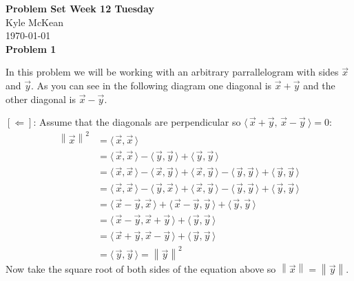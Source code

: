 \documentclass[fleqn]{article}
\newcommand{\problem}[1]{\large\textbf{Problem #1}\normalsize}
\newcommand{\normF}[1]{\left\lVert#1\right\rVert}
\begin{document}
\noindent\Large\textbf{Problem Set Week 12 Tuesday} \\
\normalsize
Kyle McKean \\
\today \\

\problem{1}

In this problem we will be working with an arbitrary parrallelogram with sides
$\vec{x}$ and $\vec{y}$. As you can see in the following diagram one diagonal is
$\vec{x} + \vec{y}$ and the other diagonal is $\vec{x} - \vec{y}$. \\

$[\Leftarrow]$: Assume that the diagonals are perpendicular so
$\langle \, \vec{x} + \vec{y}, \, \vec{x} - \vec{y} \: \rangle = 0$:
\begin{align*}
  \normF{\vec{x}}^2
  &= \langle \, \vec{x}, \vec{x} \, \rangle \\
  &= \langle \, \vec{x}, \vec{x} \, \rangle
   - \langle \, \vec{y}, \vec{y} \, \rangle
   + \langle \, \vec{y}, \vec{y} \, \rangle \\
  &= \langle \, \vec{x}, \vec{x} \, \rangle
   - \langle \, \vec{x}, \vec{y} \, \rangle
   + \langle \, \vec{x}, \vec{y} \, \rangle
   - \langle \, \vec{y}, \vec{y} \, \rangle
   + \langle \, \vec{y}, \vec{y} \, \rangle \\
  &= \langle \, \vec{x}, \vec{x} \, \rangle
   - \langle \, \vec{y}, \vec{x} \, \rangle
   + \langle \, \vec{x}, \vec{y} \, \rangle
   - \langle \, \vec{y}, \vec{y} \, \rangle
   + \langle \, \vec{y}, \vec{y} \, \rangle \\
  &= \langle \, \vec{x} - \vec{y}, \vec{x} \, \rangle
   + \langle \, \vec{x} - \vec{y}, \vec{y} \, \rangle
   + \langle \, \vec{y}, \vec{y} \, \rangle \\
  &= \langle \, \vec{x} - \vec{y}, \vec{x} + \vec{y} \, \rangle
   + \langle \, \vec{y}, \vec{y} \, \rangle \\
  &= \langle \, \vec{x} + \vec{y}, \vec{x} - \vec{y} \, \rangle
   + \langle \, \vec{y}, \vec{y} \, \rangle \\
  &= \langle \, \vec{y}, \vec{y} \, \rangle = \normF{\vec{y} }^2
\end{align*}
Now take the square root of both sides of the equation above so
$\normF{\vec{x}} = \normF{\vec{y}}$. \\
\end{document}
